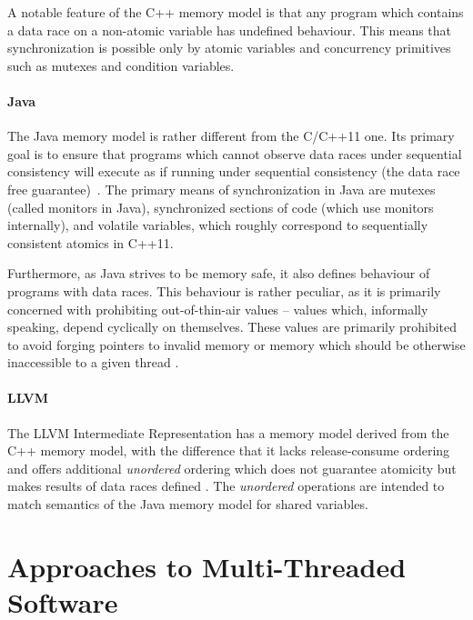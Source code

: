 A notable feature of the C++ memory model is that any program which contains a
data race on a non-atomic variable has undefined
behaviour.
This means that synchronization is possible only by atomic variables and
concurrency primitives such as mutexes and condition variables.

\paragraph{Java}
%
The Java memory model is rather different from the C/C++11 one.
Its primary goal is to ensure that programs which cannot observe data races
under sequential consistency will execute as if running under sequential
consistency (the data race free guarantee)~.
The primary means of synchronization in Java are mutexes (called monitors in Java), synchronized sections of code (which use monitors internally), and volatile variables, which roughly correspond to sequentially consistent atomics in C++11.

Furthermore, as Java strives to be memory safe, it also defines behaviour of programs with data races.
This behaviour is rather peculiar, as it is primarily concerned with prohibiting out-of-thin-air values -- values which, informally speaking, depend cyclically on themselves.
These values are primarily prohibited to avoid forging pointers to invalid memory or memory which should be otherwise inaccessible to a given thread .

\paragraph{LLVM}
%
The LLVM Intermediate Representation has a memory model derived from the C++
memory model, with the difference that it lacks release-consume ordering and
offers additional \emph{unordered} ordering which does not guarantee atomicity
but makes results of data races defined .
The \emph{unordered} operations are intended to match semantics of the Java
memory model for shared variables.

\section{Approaches to Multi-Threaded Software}

